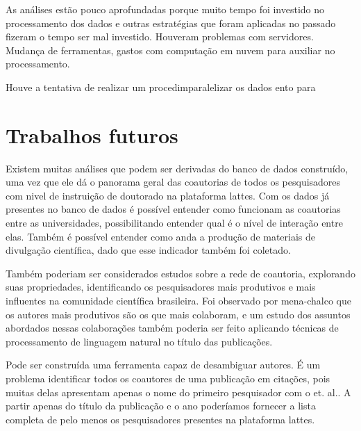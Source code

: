 As análises estão pouco aprofundadas porque muito tempo foi investido no processamento dos dados e outras estratégias que foram aplicadas no passado fizeram o tempo ser mal investido. Houveram problemas com servidores. Mudança de ferramentas, gastos com computação em nuvem para auxiliar no processamento.

Houve a tentativa de realizar um procedimparalelizar os dados ento para 

\section{Trabalhos futuros}

Existem muitas análises que podem ser derivadas do banco de dados construído, uma vez que ele dá o panorama geral das coautorias de todos os pesquisadores com nivel de instruição de doutorado na plataforma lattes. Com os dados já presentes no banco de dados é possível entender como funcionam as coautorias entre as universidades, possibilitando entender qual é o nível de interação entre elas. Também é possível entender como anda a produção de materiais de divulgação científica, dado que esse indicador também foi coletado.

Também poderiam ser considerados estudos sobre a rede de coautoria, explorando suas propriedades, identificando os pesquisadores mais produtivos e mais influentes na comunidade científica brasileira. Foi observado por mena-chalco que os autores mais produtivos são os que mais colaboram, e um estudo dos assuntos abordados nessas colaborações também poderia ser feito aplicando técnicas de processamento de linguagem natural no título das publicações.

Pode ser construída uma ferramenta capaz de desambiguar autores. É um problema identificar todos os coautores de uma publicação em citações, pois muitas delas apresentam apenas o nome do primeiro pesquisador com o et. al.. A partir apenas do título da publicação e o ano poderíamos fornecer a lista completa de pelo menos os pesquisadores presentes na plataforma lattes.